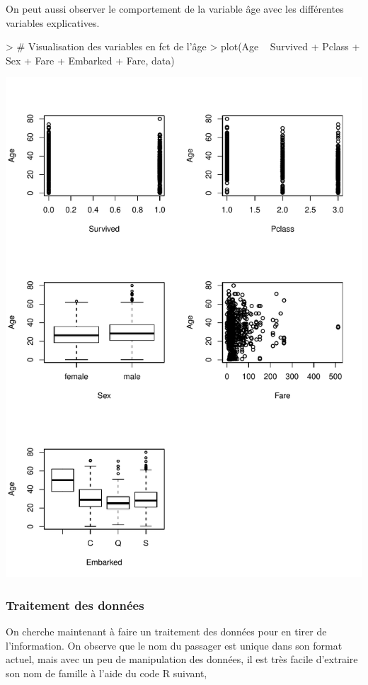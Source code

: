 \documentclass[11pt,french]{report}
\begin{document}
\bigskip
On peut aussi observer le comportement de la variable âge avec les différentes variables explicatives.
\begin{Schunk}
\begin{Sinput}
> # Visualisation des variables en fct de l'âge
> plot(Age ~ Survived + Pclass + Sex + Fare + Embarked + Fare, data)
\end{Sinput}
\end{Schunk}

\bigskip
\includegraphics{notes_de_cours-037}
\bigskip

\subsubsection{Traitement des données}
On cherche maintenant à faire un traitement des données pour en tirer de l'information. On observe que le nom du passager est unique dans son format actuel, mais avec un peu de manipulation des données, il est très facile d'extraire son nom de famille à l'aide du code R suivant,
\end{document}
